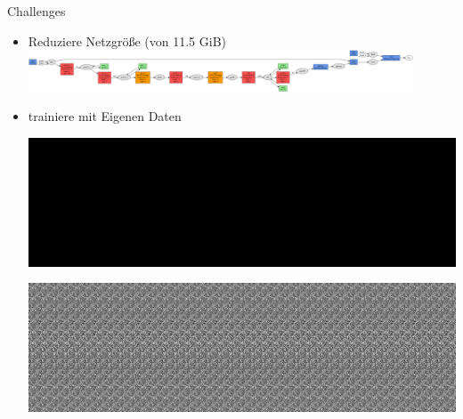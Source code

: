 \begin{frame}{Challenges}

\centering

\begin{itemize}
 \item Reduziere Netzgröße (von 11.5 GiB) \\
 \includegraphics[width=0.9\textwidth]{../images/mid.png}
 \item trainiere mit Eigenen Daten \\
 \begin{minipage}{0.45\textwidth}
 \includegraphics[width=\textwidth]{../images/out.png}
 \end{minipage}  \begin{minipage}{0.45\textwidth}
 \includegraphics[width=\textwidth]{../images/out-um.png}  
 \end{minipage}
\end{itemize}
\end{frame}